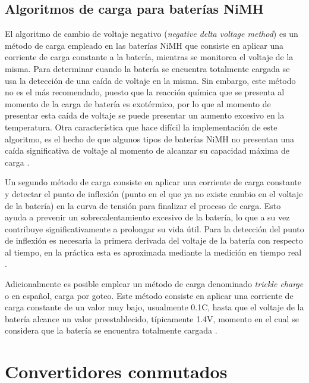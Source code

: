 \subsection{Algoritmos de carga para baterías NiMH}
\label{sec:alg_nimh}
El algoritmo de cambio de voltaje negativo (\textit{negative delta voltage method}) es un método de carga empleado
en las baterías NiMH que consiste en aplicar una corriente de carga constante a la batería, mientras se monitorea 
el voltaje de la misma. Para determinar cuando la batería se encuentra totalmente cargada se usa la detección de una 
caída de voltaje en la misma. Sin embargo, este método no es el más recomendado, puesto que la reacción química que se 
presenta al momento de la carga de batería es exotérmico, por lo que al momento de presentar esta caída de voltaje se 
puede presentar un aumento excesivo en la temperatura. Otra característica que hace difícil la implementación de este 
algoritmo, es el hecho de que algunos tipos de baterías NiMH no presentan una caída significativa de voltaje al momento
de alcanzar su capacidad máxima de carga \cite{nicolai_nickel-cadmium_1995}.

Un segundo método de carga consiste en aplicar una corriente de carga constante y 
detectar el punto de inflexión (punto en el que ya no existe cambio
en el voltaje de la batería) en la curva de tensión para finalizar el proceso de carga.
Esto ayuda a prevenir un sobrecalentamiento
excesivo de la batería, lo que a su vez contribuye significativamente a prolongar su vida útil. 
Para la detección del punto de inflexión es necesaria la primera derivada del voltaje de la batería con respecto 
al tiempo, en la práctica esta es aproximada mediante la medición en tiempo real \cite{nicolai_nickel-cadmium_1995}.

Adicionalmente es posible emplear un método de carga denominado \textit{trickle
charge} o en español, carga por goteo. Este método consiste en aplicar una 
corriente de carga constante de un valor muy bajo, usualmente 0.1C, hasta que
el voltaje de la batería alcance un valor preestablecido, típicamente 1.4V, 
momento en el cual se considera que la batería se encuentra totalmente cargada
\cite{microchip_trickle}.
\section{Convertidores conmutados}

